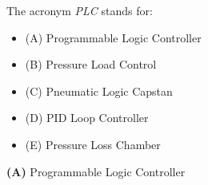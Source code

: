 

The acronym {\it PLC} stands for:

\begin{itemize}
\item{(A)} Programmable Logic Controller
\vskip 5pt 
\item{(B)} Pressure Load Control
\vskip 5pt 
\item{(C)} Pneumatic Logic Capstan
\vskip 5pt 
\item{(D)} PID Loop Controller
\vskip 5pt 
\item{(E)} Pressure Loss Chamber
\end{itemize}







{\bf (A)} Programmable Logic Controller
 










